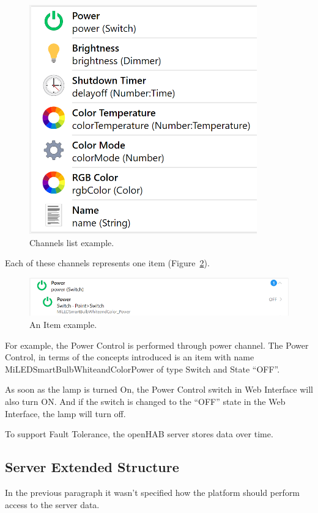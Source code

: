 \begin{figure}
  \centering
  \includegraphics[width=0.6\linewidth]{figures/XiaomiLampChannels.png}
  \caption{Channels list example.}
  \label{fig:XiaomiLampChannels-figure}
\end{figure}

Each of these channels represents one item (Figure~\ref{fig:XiaomiLampPowerItem-figure}).

\begin{figure}
  \centering
  \includegraphics[width=0.9\linewidth]{figures/XiaomiLampPowerItem.png}
  \caption{An Item example.}
  \label{fig:XiaomiLampPowerItem-figure}
\end{figure}

For example, the Power Control is performed through power channel. The Power Control, in terms of the concepts introduced is an item with name MiLEDSmartBulbWhiteandColorPower of type Switch and State “OFF”.

As soon as the lamp is turned On, the Power Control switch in Web Interface will also turn ON. And if the switch is changed to the “OFF” state in the Web Interface, the lamp will turn off.

To support Fault Tolerance, the openHAB server stores data over time.

\subsection{Server Extended Structure}

In the previous paragraph it wasn't specified how the platform should perform access to the server data. 

